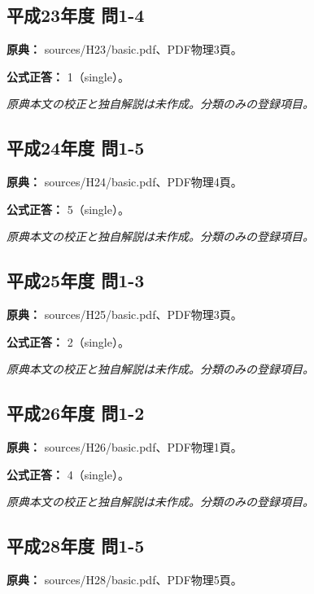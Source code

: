 \subsection{平成23年度 問1-4}
\label{q:h23-reg-basic-1-4}

\noindent\textbf{原典：} sources/H23/basic.pdf、PDF物理3頁。

\textbf{公式正答：} 1（single）。

\par\textit{原典本文の校正と独自解説は未作成。分類のみの登録項目。}

\subsection{平成24年度 問1-5}
\label{q:h24-reg-basic-1-5}

\noindent\textbf{原典：} sources/H24/basic.pdf、PDF物理4頁。

\textbf{公式正答：} 5（single）。

\par\textit{原典本文の校正と独自解説は未作成。分類のみの登録項目。}

\subsection{平成25年度 問1-3}
\label{q:h25-reg-basic-1-3}

\noindent\textbf{原典：} sources/H25/basic.pdf、PDF物理3頁。

\textbf{公式正答：} 2（single）。

\par\textit{原典本文の校正と独自解説は未作成。分類のみの登録項目。}

\subsection{平成26年度 問1-2}
\label{q:h26-reg-basic-1-2}

\noindent\textbf{原典：} sources/H26/basic.pdf、PDF物理1頁。

\textbf{公式正答：} 4（single）。

\par\textit{原典本文の校正と独自解説は未作成。分類のみの登録項目。}

\subsection{平成28年度 問1-5}
\label{q:h28-reg-basic-1-5}

\noindent\textbf{原典：} sources/H28/basic.pdf、PDF物理5頁。

